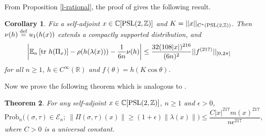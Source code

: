 \documentclass{amsart}
\newcommand{\C}{\mathbb{C}}
\theoremstyle{plain}
\newtheorem{theorem}{Theorem}[section]
\newtheorem{corollary}[theorem]{Corollary}
\theoremstyle{definition}
\theoremstyle{remark}
\begin{document}
    From Proposition \ref{l-rational}, the proof of \cite[Corollary 3.2]{MPvH25} gives the following result.
    \begin{corollary}\label{cor-trace}
       Fix a self-adjoint $x\in\mathbb{C}[\textnormal{PSL}(2,\mathbb{Z})]$ and $K=||x||_{ C^\star(\textnormal{PSL}(2,\mathbb{Z}))}$. Then $\nu(h)\overset{\textnormal{def}}{=}u_1(h(x))$ extends a compactly supported distribution, and 
        $$\left|\mathbb{E}_n\left[\textnormal{tr }h(\Pi_x)\right]-\rho(h(\lambda(x)))-\frac{1}{6n}\nu(h)\right|\leq\frac{32(108|x|)^{216}}{(6n)^2}||f^{(217)}||_{[0,2\pi]}$$
        for all $n\geq 1$, $h\in C^\infty(\mathbb{R})$ and $f(\theta)=h(K\cos\theta)$.
    \end{corollary}

Now we prove the following theorem which is analogous to \cite[Theorem 3.3]{MPvH25}.
    \begin{theorem}\label{t-prob}
For any self-adjoint $x\in \C[\textnormal{PSL}(2,\mathbb{Z})]$, $n\geq1$ and $\epsilon>0$, 
    \[ \mathrm{Prob}_n \Big( (\sigma,\tau)\in\mathcal{E}_n;\ \big\|\Pi(\sigma,\tau)(x)\big\| \geq (1+\epsilon)\big\| \lambda(x)\big\| \Big) \leq \frac{C|x|^{217}m(x)^{217}}{n\epsilon^{217}}, \] 
    where $C>0$ is a universal constant.
\end{theorem}
\end{document}

